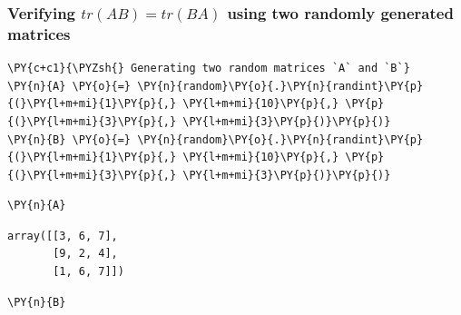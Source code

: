     \hypertarget{verifying-trab-trba-using-two-randomly-generated-matrices}{%
\subsubsection{\texorpdfstring{Verifying \(tr(AB) = tr(BA)\) using two
randomly generated
matrices}{Verifying tr(AB) = tr(BA) using two randomly generated matrices}}\label{verifying-trab-trba-using-two-randomly-generated-matrices}}

    \begin{tcolorbox}[breakable, size=fbox, boxrule=1pt, pad at break*=1mm,colback=cellbackground, colframe=cellborder]
\begin{Verbatim}[commandchars=\\\{\}]
\PY{c+c1}{\PYZsh{} Generating two random matrices `A` and `B`}
\PY{n}{A} \PY{o}{=} \PY{n}{random}\PY{o}{.}\PY{n}{randint}\PY{p}{(}\PY{l+m+mi}{1}\PY{p}{,} \PY{l+m+mi}{10}\PY{p}{,} \PY{p}{(}\PY{l+m+mi}{3}\PY{p}{,} \PY{l+m+mi}{3}\PY{p}{)}\PY{p}{)}
\PY{n}{B} \PY{o}{=} \PY{n}{random}\PY{o}{.}\PY{n}{randint}\PY{p}{(}\PY{l+m+mi}{1}\PY{p}{,} \PY{l+m+mi}{10}\PY{p}{,} \PY{p}{(}\PY{l+m+mi}{3}\PY{p}{,} \PY{l+m+mi}{3}\PY{p}{)}\PY{p}{)}
\end{Verbatim}
\end{tcolorbox}

    \begin{tcolorbox}[breakable, size=fbox, boxrule=1pt, pad at break*=1mm,colback=cellbackground, colframe=cellborder]
\begin{Verbatim}[commandchars=\\\{\}]
\PY{n}{A}
\end{Verbatim}
\end{tcolorbox}

            \begin{tcolorbox}[breakable, size=fbox, boxrule=.5pt, pad at break*=1mm, opacityfill=0]
\begin{Verbatim}[commandchars=\\\{\}]
array([[3, 6, 7],
       [9, 2, 4],
       [1, 6, 7]])
\end{Verbatim}
\end{tcolorbox}
        
    \begin{tcolorbox}[breakable, size=fbox, boxrule=1pt, pad at break*=1mm,colback=cellbackground, colframe=cellborder]
\begin{Verbatim}[commandchars=\\\{\}]
\PY{n}{B}
\end{Verbatim}
\end{tcolorbox}

